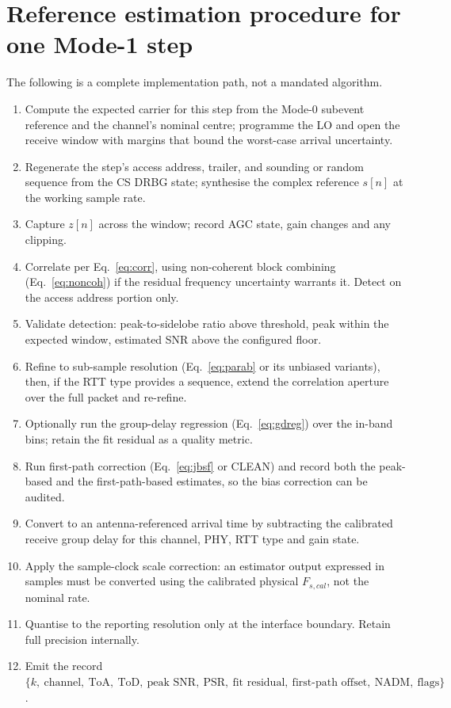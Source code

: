 \documentclass[11pt,a4paper]{article}
\newcommand{\ToD}{\mathrm{ToD}}
\newcommand{\ToA}{\mathrm{ToA}}
\newcommand{\NADM}{\mathrm{NADM}}
\begin{document}
\section{Reference estimation procedure for one Mode-1 step}

The following is a complete implementation path, not a mandated algorithm.

\begin{enumerate}[label=\textbf{P\arabic*.},leftmargin=2.6em,itemsep=2pt]
  \item Compute the expected carrier for this step from the Mode-0 subevent reference and the
    channel's nominal centre; programme the LO and open the receive window with margins that bound
    the worst-case arrival uncertainty.
  \item Regenerate the step's access address, trailer, and sounding or random sequence from the CS
    DRBG state; synthesise the complex reference $s[n]$ at the working sample rate.
  \item Capture $z[n]$ across the window; record AGC state, gain changes and any clipping.
  \item Correlate per Eq.~\eqref{eq:corr}, using non-coherent block combining
    (Eq.~\eqref{eq:noncoh}) if the residual frequency uncertainty warrants it. Detect on the access
    address portion only.
  \item Validate detection: peak-to-sidelobe ratio above threshold, peak within the expected window,
    estimated SNR above the configured floor.
  \item Refine to sub-sample resolution (Eq.~\eqref{eq:parab} or its unbiased variants), then, if the
    RTT type provides a sequence, extend the correlation aperture over the full packet and re-refine.
  \item Optionally run the group-delay regression (Eq.~\eqref{eq:gdreg}) over the in-band bins; retain
    the fit residual as a quality metric.
  \item Run first-path correction (Eq.~\eqref{eq:jbsf} or CLEAN) and record both the peak-based and
    the first-path-based estimates, so the bias correction can be audited.
  \item Convert to an antenna-referenced arrival time by subtracting the calibrated receive group
    delay for this channel, PHY, RTT type and gain state.
  \item Apply the sample-clock scale correction: an estimator output expressed in samples must be
    converted using the calibrated physical $F_{s,cal}$, not the nominal rate.
  \item Quantise to the reporting resolution only at the interface boundary. Retain full precision
    internally.
  \item Emit the record
    $\{k,\ \text{channel},\ \ToA,\ \ToD,\ \text{peak SNR},\ \text{PSR},\ \text{fit residual},\
    \text{first-path offset},\ \NADM,\ \text{flags}\}$.
\end{enumerate}
\end{document}

